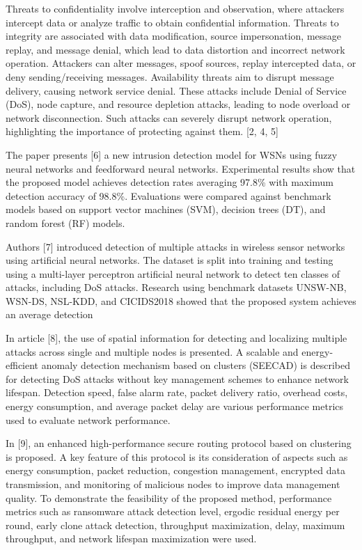 Threats to confidentiality involve interception and observation, where
attackers intercept data or analyze traffic to obtain confidential
information. Threats to integrity are associated with data modification,
source impersonation, message replay, and message denial, which lead to
data distortion and incorrect network operation. Attackers can alter
messages, spoof sources, replay intercepted data, or deny
sending/receiving messages. Availability threats aim to disrupt message
delivery, causing network service denial. These attacks include Denial
of Service (DoS), node capture, and resource depletion attacks, leading
to node overload or network disconnection. Such attacks can severely
disrupt network operation, highlighting the importance of protecting
against them. {[}2, 4, 5{]}

The paper presents {[}6{]} a new intrusion detection model for WSNs
using fuzzy neural networks and feedforward neural networks.
Experimental results show that the proposed model achieves detection
rates averaging 97.8\% with maximum detection accuracy of 98.8\%.
Evaluations were compared against benchmark models based on support
vector machines (SVM), decision trees (DT), and random forest (RF)
models.

Authors {[}7{]} introduced detection of multiple attacks in wireless
sensor networks using artificial neural networks. The dataset is split
into training and testing using a multi-layer perceptron artificial
neural network to detect ten classes of attacks, including DoS attacks.
Research using benchmark datasets UNSW-NB, WSN-DS, NSL-KDD, and
CICIDS2018 showed that the proposed system achieves an average detection

In article {[}8{]}, the use of spatial information for detecting and
localizing multiple attacks across single and multiple nodes is
presented. A scalable and energy-efficient anomaly detection mechanism
based on clusters (SEECAD) is described for detecting DoS attacks
without key management schemes to enhance network lifespan. Detection
speed, false alarm rate, packet delivery ratio, overhead costs, energy
consumption, and average packet delay are various performance metrics
used to evaluate network performance.

In {[}9{]}, an enhanced high-performance secure routing protocol based
on clustering is proposed. A key feature of this protocol is its
consideration of aspects such as energy consumption, packet reduction,
congestion management, encrypted data transmission, and monitoring of
malicious nodes to improve data management quality. To demonstrate the
feasibility of the proposed method, performance metrics such as
ransomware attack detection level, ergodic residual energy per round,
early clone attack detection, throughput maximization, delay, maximum
throughput, and network lifespan maximization were used.

